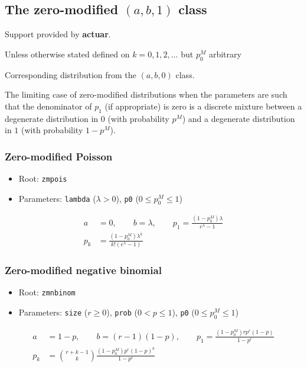 \documentclass[x11names]{article}
\newcommand{\pkg}[1]{\textbf{#1}}
\newcommand{\code}[1]{\texttt{#1}}
\begin{document}
\subsection[The zero-modified (a, b, 0) class]{The zero-modified $(a, b, 1)$ class}
\label{sec:app:discrete:zm}

Support provided by \pkg{actuar}.

Unless otherwise stated defined on $k = 0, 1, 2, \dots$ but $p_0^M$ arbitrary

Corresponding distribution from the $(a, b, 0)$ class.

The limiting case of zero-modified distributions when the parameters
are such that the denominator of $p_1$ (if appropriate) is zero is a
discrete mixture between a degenerate distribution in $0$ (with
probability $p^M$) and a degenerate distribution in $1$ (with
probability $1 - p^M$).

\subsubsection{Zero-modified Poisson}

\begin{itemize}
\item Root: \code{zmpois}
\item Parameters: \code{lambda} ($\lambda > 0$),
  \code{p0} ($0 \leq p_0^M \leq 1$)
\end{itemize}
\begin{align*}
  a &= 0, \qquad b = \lambda, \qquad
      p_1 = \frac{(1 - p_0^M) \lambda}{e^\lambda - 1} \\
  p_k &= \frac{(1 - p_0^M) \lambda^k}{k! (e^\lambda - 1)}
\end{align*}

\subsubsection{Zero-modified negative binomial}

\begin{itemize}
\item Root: \code{zmnbinom}
\item Parameters: \code{size} ($r \geq 0$),
  \code{prob} ($0 < p \leq 1$),
  \code{p0} ($0 \leq p_0^M \leq 1$)
\end{itemize}
\begin{align*}
  a &= 1 - p, \qquad b = (r - 1)(1 - p), \qquad
      p_1 = \frac{(1 - p_0^M) r p^r (1 - p)}{1 - p^r} \\
  p_k &= \binom{r+k-1}{k} \frac{(1 - p_0^M) p^r (1 - p)^k}{1 - p^r}
\end{align*}
\end{document}
